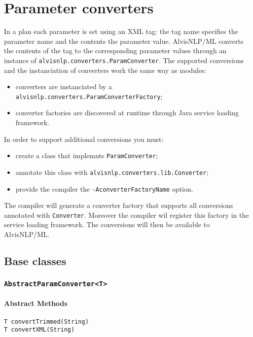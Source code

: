 \documentclass[a4paper]{article}
\begin{document}
\section{Parameter converters}
In a plan each parameter is set using an XML tag: the tag name specifies the parameter name and the contents the parameter value.
AlvisNLP/ML converts the contents of the tag to the corresponding parameter values through an instance of \texttt{alvisnlp.converters.ParamConverter}.
The supported conversions and the instanciation of converters work the same way as modules:
\begin{itemize}
\item converters are instanciated by a \texttt{alvisnlp.converters.ParamConverterFactory};
\item converter factories are discovered at runtime through Java service loading framework.
\end{itemize}

In order to support additional conversions you must:
\begin{itemize}
\item create a class that implemnts \texttt{ParamConverter};
\item annotate this class with \texttt{alvisnlp.converters.lib.Converter};
\item provide the compiler the \texttt{-AconverterFactoryName} option.
\end{itemize}

The compiler will generate a converter factory that supports all conversions annotated with \texttt{Converter}.
Moreover the compiler wil register this factory in the service loading framework.
The conversions will then be available to AlvisNLP/ML.

\subsection{Base classes}

\subsubsection{\texttt{AbstractParamConverter<T>}}

\paragraph{Abstract Methods}
\texttt{T convertTrimmed(String)}\\
\texttt{T convertXML(String)}\\
\end{document}
